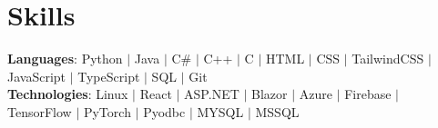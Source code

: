 \section{Skills}
    \begin{itemize}[leftmargin=0.15in, label={}]
	\small{\item{
		\textbf{Languages}{: Python $|$ Java $|$ C\# $|$ C++ $|$ C $|$ HTML $|$ CSS $|$ TailwindCSS $|$ JavaScript $|$ TypeScript $|$ SQL $|$ Git} \\
		\textbf{Technologies}{: Linux $|$ React $|$ ASP.NET $|$ Blazor $|$ Azure $|$ Firebase $|$ TensorFlow $|$ PyTorch $|$ Pyodbc $|$ MYSQL $|$ MSSQL}
	}}
    \end{itemize}
